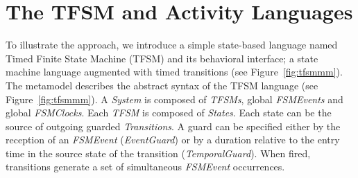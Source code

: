 \chapter{The TFSM and Activity Languages}
\label{ap:languages}
To illustrate the approach, we introduce a simple state-based language named Timed Finite State Machine (TFSM) and its behavioral interface; a state machine language augmented with timed transitions (see Figure~\ref{fig:tfsmmm}). The metamodel describes the abstract syntax of the TFSM language (see Figure~\ref{fig:tfsmmm}). A \emph{System} is composed of \emph{TFSMs}, global \emph{FSMEvents} and global \emph{FSMClocks}. Each \emph{TFSM} is composed of \emph{States}. Each state can be the source of outgoing guarded \emph{Transitions}. A guard can be specified either by the reception of an \emph{FSMEvent} (\emph{EventGuard}) or by a duration relative to the entry time in the source state of the transition (\emph{TemporalGuard}). When fired, transitions generate a set of simultaneous \emph{FSMEvent} occurrences.

